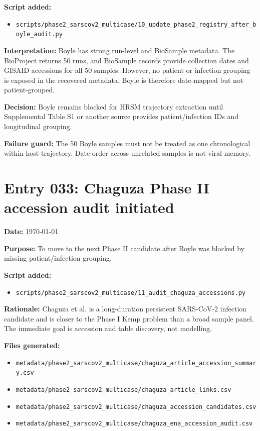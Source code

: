 \textbf{Script added:}
\begin{itemize}
    \item \texttt{scripts/phase2\_sarscov2\_multicase/10\_update\_phase2\_registry\_after\_boyle\_audit.py}
\end{itemize}

\textbf{Interpretation:} Boyle has strong run-level and BioSample metadata. The BioProject returns 50 runs, and BioSample records provide collection dates and GISAID accessions for all 50 samples. However, no patient or infection grouping is exposed in the recovered metadata. Boyle is therefore date-mapped but not patient-grouped.

\textbf{Decision:} Boyle remains blocked for HRSM trajectory extraction until Supplemental Table S1 or another source provides patient/infection IDs and longitudinal grouping.

\textbf{Failure guard:} The 50 Boyle samples must not be treated as one chronological within-host trajectory. Date order across unrelated samples is not viral memory.

\section*{Entry 033: Chaguza Phase II accession audit initiated}

\textbf{Date:} \today

\textbf{Purpose:} To move to the next Phase II candidate after Boyle was blocked by missing patient/infection grouping.

\textbf{Script added:}
\begin{itemize}
    \item \texttt{scripts/phase2\_sarscov2\_multicase/11\_audit\_chaguza\_accessions.py}
\end{itemize}

\textbf{Rationale:} Chaguza et al. is a long-duration persistent SARS-CoV-2 infection candidate and is closer to the Phase I Kemp problem than a broad sample panel. The immediate goal is accession and table discovery, not modelling.

\textbf{Files generated:}
\begin{itemize}
    \item \texttt{metadata/phase2\_sarscov2\_multicase/chaguza\_article\_accession\_summary.csv}
    \item \texttt{metadata/phase2\_sarscov2\_multicase/chaguza\_article\_links.csv}
    \item \texttt{metadata/phase2\_sarscov2\_multicase/chaguza\_accession\_candidates.csv}
    \item \texttt{metadata/phase2\_sarscov2\_multicase/chaguza\_ena\_accession\_audit.csv}
\end{itemize}

